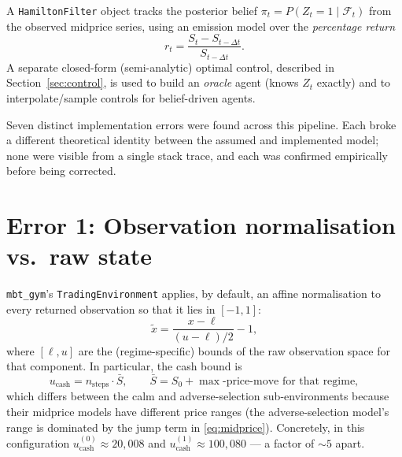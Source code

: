 \documentclass[11pt]{article}
\begin{document}
A \texttt{HamiltonFilter} object tracks the posterior belief $\pi_t = P(Z_t = 1 \mid \mathcal{F}_t)$ from the observed midprice series, using an emission model over the \emph{percentage return}
\begin{equation}
r_t = \frac{S_t - S_{t-\Delta t}}{S_{t-\Delta t}}.
\label{eq:pctreturn}
\end{equation}
A separate closed-form (semi-analytic) optimal control, described in Section~\ref{sec:control}, is used to build an \emph{oracle} agent (knows $Z_t$ exactly) and to interpolate/sample controls for belief-driven agents.

Seven distinct implementation errors were found across this pipeline. Each broke a different theoretical identity between the assumed and implemented model; none were visible from a single stack trace, and each was confirmed empirically before being corrected.

\section{Error 1: Observation normalisation vs.\ raw state}
\label{sec:norm}

\texttt{mbt\_gym}'s \texttt{TradingEnvironment} applies, by default, an affine normalisation to every returned observation so that it lies in $[-1,1]$:
\begin{equation}
\tilde{x} = \frac{x - \ell}{(u - \ell)/2} - 1,
\label{eq:obsnorm}
\end{equation}
where $[\ell, u]$ are the (regime-specific) bounds of the raw observation space for that component. In particular, the cash bound is
\begin{equation}
u_{\text{cash}} = n_{\text{steps}} \cdot \bar{S},
\qquad \bar S = S_0 + \max\text{-price-move for that regime},
\end{equation}
which differs between the calm and adverse-selection sub-environments because their midprice models have different price ranges (the adverse-selection model's range is dominated by the jump term in \eqref{eq:midprice}). Concretely, in this configuration $u_{\text{cash}}^{(0)} \approx 20{,}008$ and $u_{\text{cash}}^{(1)} \approx 100{,}080$ — a factor of $\sim 5$ apart.
\end{document}

